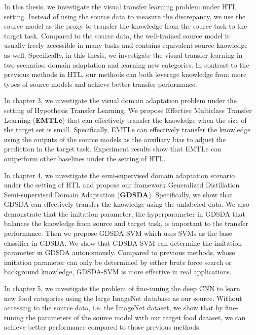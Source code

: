 \documentclass[12pt,twoside]{report}
\numberwithin{figure}{chapter}
\newenvironment{preliminary}%
{\pagestyle{plain}\pagenumbering{roman}}%
{\pagenumbering{arabic}}
\begin{document}
\begin{preliminary}
		In this thesis, we investigate the visual transfer learning problem under HTL setting. Instead of using the source data to measure the discrepancy, we use the source model as the proxy to transfer the knowledge from the source task to the target task. Compared to the source data, the well-trained source model is usually freely accessible in many tasks and contains equivalent source knowledge as well. Specifically, in this thesis, we investigate the visual transfer learning in two scenarios: domain adaptation and learning new categories. In contrast to the previous methods in HTL, our methods can both leverage knowledge from more types of source models and achieve better transfer performance.
		
		In chapter 3, we investigate the visual domain adaptation problem under the setting of Hypothesis Transfer Learning. We propose Effective Multiclass Transfer Learning (\textbf{EMTLe}) that can effectively transfer the knowledge when the size of the target set is small.  Specifically, EMTLe can effectively transfer the knowledge using the outputs of the source models as the auxiliary bias to adjust the prediction in the target task. Experiment results show that EMTLe can outperform other baselines under the setting of HTL.
		
		In chapter 4, we investigate the semi-supervised domain adaptation scenario under the setting of HTL and propose our framework {Generalized Distillation Semi-supervised Domain Adaptation} (\textbf{GDSDA}). Specifically, we show that GDSDA can effectively transfer the knowledge using the unlabeled data. We also demonstrate that the imitation parameter, the hyperparameter in GDSDA that balances the knowledge from source and target task, is important to the transfer performance. Then we propose GDSDA-SVM which uses SVMs as the base classifier in GDSDA. We show that GDSDA-SVM can determine the imitation parameter in GDSDA autonomously. Compared to previous methods, whose imitation parameter can only be determined by either brute force search or background knowledge, GDSDA-SVM is more effective in real applications.
		
		In chapter 5, we investigate the problem of fine-tuning the deep CNN to learn new food categories using the large ImageNet database as our source. Without accessing to the source data, i.e. the ImageNet dataset, we show that by fine-tuning the parameters of the source model with our target food dataset, we can achieve better performance compared to those previous methods.
		

\end{preliminary}
\end{document}

